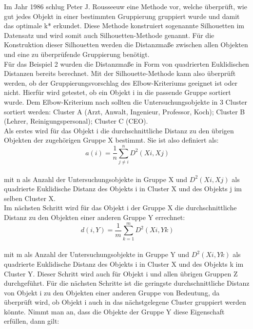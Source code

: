 \documentclass[12pt,titlepage]{article}
\begin{document}
Im Jahr 1986 schlug Peter J. Rousseeuw \cite{ROUSSEEUW198753} eine Methode vor, welche überprüft, wie gut jedes Objekt in einer bestimmten Gruppierung gruppiert wurde und damit das optimale k* erkundet. Diese Methode konstruiert sogenannte Silhouetten im Datensatz und wird somit auch Silhouetten-Methode genannt. Für die Konstruktion dieser Silhouetten werden die Distanzmaße zwischen allen Objekten und eine zu überprüfende Gruppierung benötigt. \\
Für das Beispiel 2 wurden die Distanzmaße in Form von quadrierten Euklidischen Distanzen bereits berechnet. Mit der Silhouette-Methode kann also überprüft werden, ob der Gruppierungsvorschlag des Elbow-Kriteriums geeignet ist oder nicht. Hierfür wird getestet, ob ein Objekt i in die passende Gruppe sortiert wurde. Dem Elbow-Kriterium nach sollten die Untersuchungsobjekte in 3 Cluster sortiert werden: Cluster A (Arzt, Anwalt, Ingenieur, Professor, Koch); Cluster B (Lehrer, Reinigungspersonal); Cluster C (CEO). \\
Als erstes wird für das Objekt i die durchschnittliche Distanz zu den übrigen Objekten der zugehörigen Gruppe X  bestimmt. Sie ist also definiert als: \\
\begin{equation}
 \ a(i)=\frac{1}{n}\sum_{j\neq i}^{n} D^{2}(Xi,Xj)
\end{equation} \\
mit n als Anzahl der Untersuchungsobjekte in Gruppe X und $D^{2}(Xi,Xj)$ als quadrierte Euklidische Distanz des Objekts i in Cluster X und des Objekts j im selben Cluster X.\\
Im nächsten Schritt wird für das Objekt i der Gruppe X die durchschnittliche Distanz zu den Objekten einer anderen Gruppe Y errechnet: \\
\begin{equation}
 \ d(i,Y)=\frac{1}{m}\sum_{k=1}^{m} D^{2}(Xi,Yk)
\end{equation} \\
mit m als Anzahl der Untersuchungsobjekte in Gruppe Y und $D^{2}(Xi,Yk)$ als quadrierte Euklidische Distanz des Objekts i in Cluster X und des Objekts k im Cluster Y. Dieser Schritt wird auch für Objekt i und allen übrigen Gruppen Z durchgeführt. Für die nächsten Schritte ist die geringste durchschnittliche Distanz von Objekt i zu den Objekten einer anderen Gruppe von Bedeutung, da überprüft wird, ob Objekt i auch in das nächstgelegene Cluster gruppiert werden könnte. Nimmt man an, dass die Objekte der Gruppe Y diese Eigenschaft erfüllen, dann gilt:\\
\end{document}
